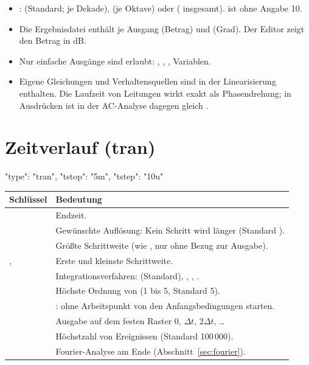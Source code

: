\begin{itemize}
  \item {}:  (Standard;  je Dekade),
     (je Oktave) oder  ( insgesamt).
     ist ohne Angabe 10.
  \item Die Ergebnisdatei enthält je Ausgang  (Betrag) und
     (Grad). Der Editor zeigt den Betrag in dB.
  \item Nur einfache Ausgänge sind erlaubt: ,
    , , Variablen.
  \item Eigene Gleichungen und Verhaltensquellen sind in der
    Linearisierung enthalten. Die Laufzeit von Leitungen wirkt exakt als
    Phasendrehung;  in Ausdrücken ist in der
    AC-Analyse dagegen gleich .
\end{itemize}

\section{Zeitverlauf (tran)}
\label{sec:tran}

\begin{json}
{ "type": "tran", "tstop": "5m", "tstep": "10u" }
\end{json}

\begin{longtable}{@{}lP{10.6cm}@{}}
  \toprule
  Schlüssel & Bedeutung \\
  \midrule
  \endhead
  \bottomrule
  \endfoot
   & Endzeit. \\
   & Gewünschte Auflösung: Kein Schritt wird länger (Standard ). \\
   & Größte Schrittweite (wie , nur ohne Bezug zur Ausgabe). \\
  ,  & Erste und kleinste Schrittweite. \\
   & Integrationsverfahren:  (Standard), , , . \\
   & Höchste Ordnung von  (1 bis 5, Standard 5). \\
   & : ohne Arbeitspunkt von den Anfangsbedingungen starten. \\
   & Ausgabe auf dem festen Raster 0, $\Delta t$, $2\Delta t$, \dots \\
   & Höchstzahl von Ereignissen (Standard 100\,000). \\
   & Fourier-Analyse am Ende (Abschnitt~\ref{sec:fourier}). \\
\end{longtable}

